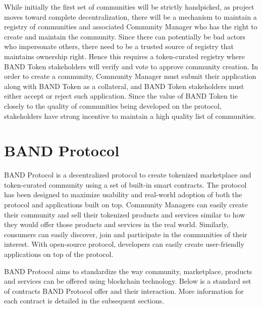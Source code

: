 \documentclass[letterpaper,11pt]{article}
\begin{document}
While initially the first set of communities will be strictly handpicked, as project moves toward complete decentralization, there will be a mechanism to maintain a registry of communities and associated Community Manager who has the right to create and maintain the community. Since there can potentially be bad actors who impersonate others, there need to be a trusted source of registry that maintains ownership right. Hence this requires a token-curated registry where BAND Token stakeholders will verify and vote to approve community creation. In order to create a community, Community Manager must submit their application along with BAND Token as a collateral, and BAND Token stakeholders must either accept or reject such application. Since the value of BAND Token tie closely to the quality of communities being developed on the protocol, stakeholders have strong incentive to maintain a high quality list of communities.

\newpage

\section{BAND Protocol}
BAND Protocol is a decentralized protocol to create tokenized marketplace and token-curated community using a set of built-in smart contracts. The protocol has been designed to maximize usability and real-world adoption of both the protocol and applications built on top. Community Managers can easily create their community and sell their tokenized products and services similar to how they would offer those products and services in the real world. Similarly, consumers can easily discover, join and participate in the communities of their interest. With open-source protocol, developers can easily create user-friendly applications on top of the protocol.

BAND Protocol aims to standardize the way community, marketplace, products and services can be offered using blockchain technology. Below is a standard set of contracts BAND Protocol offer and their interaction. More information for each contract is detailed in the subsequent sections.
\end{document}
